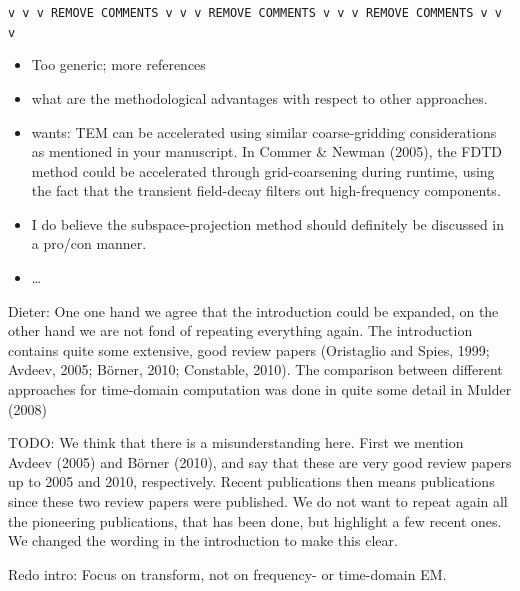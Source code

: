 \documentclass[extra, camera,%
    referee,     %
]{gji}
\begin{document}
{\color{alizarin}
\verb!v v v REMOVE COMMENTS v v v REMOVE COMMENTS v v v REMOVE COMMENTS v v v!
}
{\color{mygreen}
\begin{itemize}
  \item Too generic; more references
  \item what are the methodological advantages with respect to other
    approaches.
  \item wants: TEM can be accelerated using similar coarse-gridding
    considerations as mentioned in your manuscript. In Commer \& Newman (2005),
    the FDTD method could be accelerated through grid-coarsening during
    runtime, using the fact that the transient field-decay filters out
    high-frequency components.
  \item I do believe the subspace-projection method should definitely be
    discussed in a pro/con manner.
  \item \ldots
\end{itemize}


Dieter: One one hand we agree that the introduction could be expanded, on the
other hand we are not fond of repeating everything again. The introduction
contains quite some extensive, good review papers (Oristaglio and Spies, 1999;
Avdeev, 2005; Börner, 2010; Constable, 2010). The comparison between different
approaches for time-domain computation was done in quite some detail in Mulder
(2008)


TODO: We think that there is a misunderstanding here. First we mention Avdeev
(2005) and Börner (2010), and say that these are very good review papers up to
2005 and 2010, respectively. Recent publications then means publications since
these two review papers were published. We do not want to repeat again all the
pioneering publications, that has been done, but highlight a few recent ones.
We changed the wording in the introduction to make this clear.

Redo intro: Focus on transform, not on frequency- or time-domain EM.

}
\end{document}
